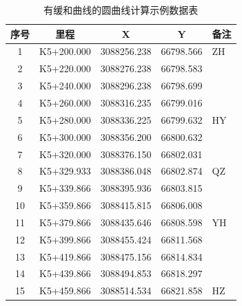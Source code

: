 \begin{table}[htbp]
\centering
\caption{有缓和曲线的圆曲线计算示例数据表}
\label{tab:HYRoute}
\begin{tabular}{ccccl}
\hline
序号 & 里程	    &        X	     &      Y	   &  备注 \\
\hline
1  & K5+200.000 & 3088256.238 &  	66798.566 &  ZH  \\
2  & K5+220.000 & 3088276.238 &  	66798.583 &      \\
3  & K5+240.000 & 3088296.238 &  	66798.699 &      \\
4  & K5+260.000 & 3088316.235 &  	66799.016 &      \\
5  & K5+280.000 & 3088336.225 &  	66799.632 &  HY  \\
6  & K5+300.000 & 3088356.200 &  	66800.632 &      \\
7  & K5+320.000 & 3088376.150 &  	66802.031 &      \\
8  & K5+329.933 & 3088386.048 &  	66802.874 &  QZ  \\
9  & K5+339.866 & 3088395.936 &  	66803.815 &      \\
10 & K5+359.866 & 3088415.815 &  	66806.008 &      \\
11 & K5+379.866 & 3088435.646 &  	66808.598 &  YH  \\
12 & K5+399.866 & 3088455.424 &  	66811.568 &      \\
13 & K5+419.866 & 3088475.156 &  	66814.834 &      \\
14 & K5+439.866 & 3088494.853 & 	66818.297 &      \\
15 & K5+459.866 & 3088514.534 &  	66821.858 &  HZ \\
\hline
\end{tabular}

\end{table}
